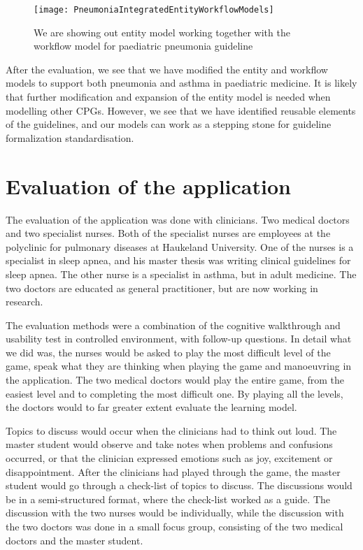\begin{figure}[h!]
	\texttt{[image: PneumoniaIntegratedEntityWorkflowModels]}
	\caption {We are showing out entity model working together with the workflow model for paediatric pneumonia guideline \parencite{RepublicofKeny2016}}	
	\label{fig:PneumoniaPneumoniaIntegratedEntityWorkflowModels}
\end{figure}

After the evaluation, we see that we have modified the entity and workflow models to support both pneumonia and asthma in paediatric medicine. It is likely that further modification and expansion of the entity model is needed when modelling other CPGs. However, we see that we have identified reusable elements of the guidelines, and our models can work as a stepping stone for guideline formalization standardisation.


\section{Evaluation of the application}
The evaluation of the application was done with clinicians.	Two medical doctors and two specialist nurses. Both of the specialist nurses are employees at the polyclinic for pulmonary diseases at Haukeland University. One of the nurses is a specialist in sleep apnea, and his master thesis was writing clinical guidelines for sleep apnea. The other nurse is a specialist in asthma, but in adult medicine. The two doctors are educated as general practitioner, but are now working in research.

The evaluation methods were a combination of the cognitive walkthrough and usability test in controlled environment, with follow-up questions. In detail what we did was, the nurses would be asked to play the most difficult level of the game, speak what they are thinking when playing the game and manoeuvring in the application.  The two medical doctors would play the entire game, from the easiest level and to completing the most difficult one. By playing all the levels, the doctors would to far greater extent evaluate the learning model.

Topics to discuss would occur when the clinicians had to think out loud. The master student would observe and take notes when problems and confusions occurred, or that the clinician expressed emotions such as joy, excitement or disappointment. After the clinicians had played through the game, the master student would go through a check-list of topics to discuss. The discussions would be in a semi-structured format, where the check-list worked as a guide. The discussion with the two nurses would be individually, while  the discussion with the two doctors was done in a small focus group, consisting of the two medical doctors and the master student. 

